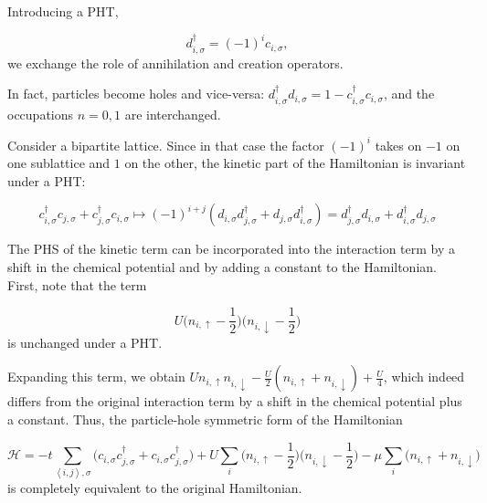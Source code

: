 Introducing a \ac{PHT},

\begin{equation}\label{eq:PHT}
d_{ i, \sigma}^\dagger = (-1)^i c_{i, \sigma} ,
\end{equation}
we exchange the role of annihilation and creation operators.

In fact, particles become holes and vice-versa: $d_{ i, \sigma}^\dagger d_{ i, \sigma} = 1 - c_{ i, \sigma}^\dagger c_{ i, \sigma} $, and the occupations $n = 0, 1$ are interchanged.

Consider a bipartite lattice.
Since in that case the factor $(-1)^i$ takes on $-1$ on one sublattice and $1$ on the other, the kinetic part of the Hamiltonian is invariant under a \ac{PHT}:

\begin{equation}
c_{i, \sigma}^\dagger c_{j, \sigma} + c_{j, \sigma}^\dagger c_{i, \sigma} \mapsto (-1)^{i+j} ( d_{i, \sigma} d_{j, \sigma}^\dagger + d_{j, \sigma} d_{i, \sigma}^\dagger ) = d_{j, \sigma}^\dagger d_{i, \sigma} + d_{i, \sigma}^\dagger d_{j, \sigma}
\end{equation}

The \ac{PHS} of the kinetic term can be incorporated into the interaction term by a shift in the chemical potential and by adding a constant to the Hamiltonian.
First, note that the term

\begin{equation*}
U \bigg( n_{i,\uparrow} - \frac{1}{2} \bigg) \bigg( n_{i,\downarrow} - \frac{1}{2} \bigg)
\end{equation*}
is unchanged under a \ac{PHT}.

Expanding this term, we obtain $U n_{i,\uparrow} n_{i,\downarrow} - \frac{U}{2} (n_{i,\uparrow} + n_{i,\downarrow}) + \frac{U}{4}$, which indeed differs from the original interaction term by a shift in the chemical potential plus a constant.
Thus, the particle-hole symmetric form of the Hamiltonian 

\begin{equation}
\mathcal{H} = -t \sum_{\left\langle i, j \right \rangle, \sigma} \bigg( c_{i,\sigma} c_{j,\sigma}^\dagger + c_{i,\sigma} c_{j,\sigma}^\dagger \bigg) + U \sum_{i} \bigg( n_{i,\uparrow} - \frac{1}{2} \bigg) \bigg( n_{i,\downarrow} - \frac{1}{2} \bigg) -\mu \sum_i \bigg( n_{i,\uparrow} + n_{i,\downarrow} \bigg)
\end{equation}
is completely equivalent to the original Hamiltonian.

